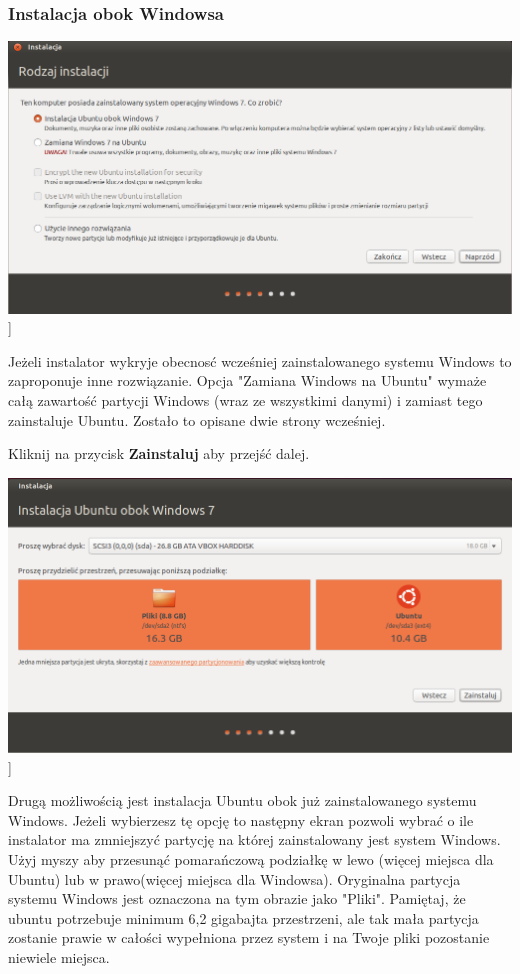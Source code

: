 \subsubsection{Instalacja obok Windowsa}
\begin{center}
	\includegraphics[scale=0.5]{images/instalator_partycjonowanie_obok_wondows7.png}]
\end{center}
Jeżeli instalator wykryje obecnosć wcześniej zainstalowanego systemu Windows to zaproponuje inne rozwiązanie. Opcja "Zamiana Windows na Ubuntu" wymaże całą zawartość partycji Windows (wraz ze wszystkimi danymi) i zamiast tego zainstaluje Ubuntu. Zostało to opisane dwie strony wcześniej.
\begin{flushright}
Kliknij na przycisk \textbf{Zainstaluj} aby przejść dalej.
\end{flushright}
\clearpage
\begin{center}
	\includegraphics[scale=0.5]{images/instalator_partycjonowanie_obok_wondows7_2.png}]
\end{center}
Drugą możliwością jest instalacja Ubuntu obok już zainstalowanego systemu Windows. Jeżeli wybierzesz tę opcję to następny ekran pozwoli wybrać o ile instalator ma zmniejszyć partycję na której zainstalowany jest system Windows. Użyj myszy aby przesunąć pomarańczową podziałkę w lewo (więcej miejsca dla Ubuntu) lub w prawo(więcej miejsca dla Windowsa). Oryginalna partycja systemu Windows jest oznaczona na tym obrazie jako "Pliki". Pamiętaj, że ubuntu potrzebuje minimum 6,2 gigabajta przestrzeni, ale tak mała partycja zostanie prawie w całości wypełniona przez system i na Twoje pliki pozostanie niewiele miejsca.

